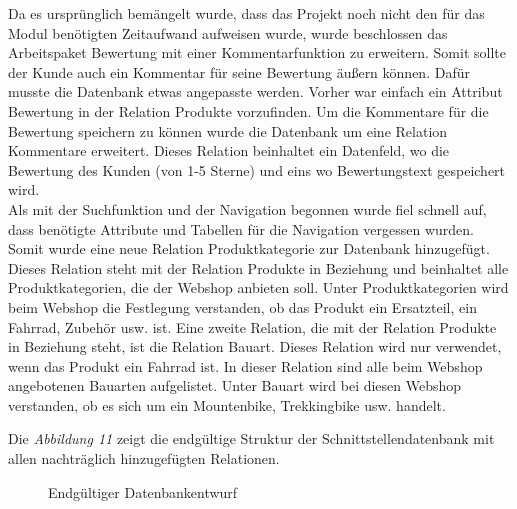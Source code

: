 Da es ursprünglich bemängelt wurde, dass das Projekt noch nicht den für das Modul benötigten Zeitaufwand aufweisen wurde, wurde beschlossen das Arbeitspaket \glqq Bewertung\grqq{} mit einer Kommentarfunktion zu erweitern. Somit sollte der Kunde auch ein Kommentar für seine Bewertung äußern können. Dafür musste die Datenbank etwas angepasste werden. Vorher war einfach ein Attribut \glqq Bewertung\grqq{} in der Relation \glqq Produkte\grqq{} vorzufinden. Um die Kommentare für die Bewertung speichern zu können wurde die Datenbank um eine Relation \glqq Kommentare\grqq{} erweitert. Dieses Relation beinhaltet ein Datenfeld, wo die Bewertung des Kunden (von 1-5 Sterne) und eins wo Bewertungstext gespeichert wird. \\
Als mit der Suchfunktion und der Navigation begonnen wurde fiel schnell auf, dass benötigte Attribute und Tabellen für die Navigation vergessen wurden. Somit wurde eine neue Relation \glqq Produktkategorie\grqq{} zur Datenbank hinzugefügt. Dieses Relation steht mit der Relation \glqq Produkte\grqq{} in Beziehung und beinhaltet alle Produktkategorien, die der Webshop anbieten soll. Unter Produktkategorien wird beim Webshop die Festlegung verstanden, ob das Produkt ein Ersatzteil, ein Fahrrad, Zubehör usw. ist. Eine zweite Relation, die mit der Relation Produkte in Beziehung steht, ist die Relation \glqq Bauart\grqq{}. Dieses Relation wird nur verwendet, wenn das Produkt ein Fahrrad ist. In dieser Relation sind alle beim Webshop angebotenen Bauarten aufgelistet. Unter Bauart wird bei diesen Webshop verstanden, ob es sich um ein Mountenbike, Trekkingbike usw. handelt.

Die \textit{Abbildung 11} zeigt die endgültige Struktur der Schnittstellendatenbank mit allen nachträglich hinzugefügten Relationen. 
\begin{figure}[H]
	\begin{center}
	\end{center}
	\caption{Endgültiger Datenbankentwurf}
	\label{fig:Abbildung 10}
\end{figure}

